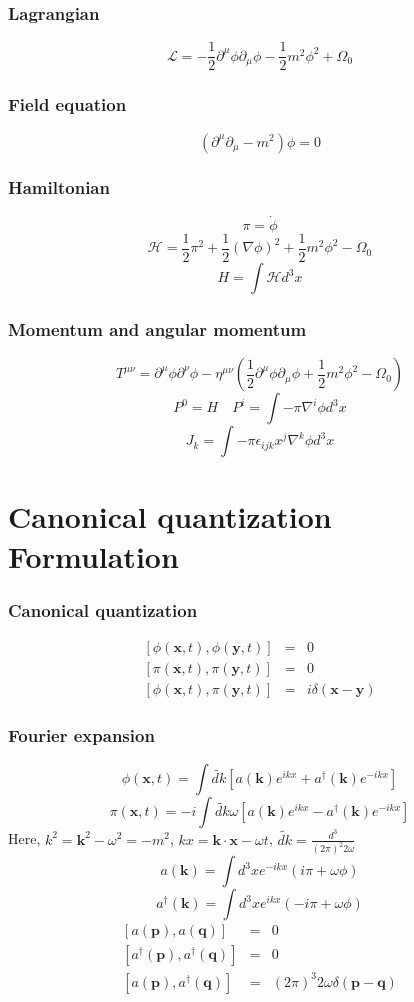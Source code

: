 \subsubsection{Lagrangian}
\[\mathcal{L} = -\frac{1}{2} \partial^{\mu} \phi \partial_{\mu} \phi -\frac{1}{2}m^2 \phi^2 + \Omega_0\]
\subsubsection{Field equation}
\[(\partial^{\mu} \partial_{\mu} - m^2) \phi = 0\]
\subsubsection{Hamiltonian}
\[\pi = \dot{\phi}\]
\[\mathcal{H} = \frac{1}{2} \pi^2 + \frac{1}{2} (\nabla \phi)^2 + \frac{1}{2} m^2 \phi^2-\Omega_0\]
\[H = \int \mathcal{H} d^3 x\]
\subsubsection{Momentum and angular momentum}
\[T^{\mu \nu} = \partial^{\mu} \phi \partial^{\nu} \phi - \eta^{\mu \nu}(\frac{1}{2}\partial^{\mu}\phi \partial_{\mu} \phi + \frac{1}{2}m^2 \phi^2 -\Omega_0)\]
\[P^0 = H \quad P^i = \int -\pi \nabla^i \phi d^3 x\]
\[J_k = \int - \pi \epsilon_{ijk} x^{j} \nabla^{k} \phi d^3 x\]

\section{Canonical quantization Formulation}
\subsubsection{Canonical quantization}
\begin{eqnarray}
\left[\phi(\bm{x},t),\phi(\bm{y},t)\right] &=& 0 \nonumber \\
\left[\pi(\bm{x},t),\pi(\bm{y},t)\right] &=& 0 \nonumber \\
\left[\phi(\bm{x},t),\pi(\bm{y},t)\right] &=& i \delta(\bm{x}-\bm{y}) \nonumber
\end{eqnarray}
\subsubsection{Fourier expansion}
\[\phi(\bm{x},t) = \int \widetilde{dk} \left[ a(\bm{k})e^{ikx} + a^{\dagger}(\bm{k})e^{-ikx} \right]\]
\[\pi(\bm{x},t) = -i \int  \widetilde{dk} \omega \left[ a(\bm{k})e^{ikx} - a^{\dagger}(\bm{k})e^{-ikx} \right]\]
Here, $k^2 = \bm{k}^2 - \omega^2 = -m^2$, $kx = \bm{k}\cdot \bm{x} - \omega t$, $\widetilde{dk} = \frac{d^3}{(2\pi)^2 2\omega}$
\[a(\bm{k}) = \int d^3 x e^{-ikx}(i\pi+\omega \phi)\]
\[a^{\dagger}(\bm{k}) = \int d^3 x e^{ikx}(-i\pi+\omega \phi)\]
\begin{eqnarray}
\left[a(\bm{p}),a(\bm{q})\right] &=& 0 \nonumber \\
\left[a^{\dagger}(\bm{p}),a^{\dagger}(\bm{q})\right] &=& 0 \nonumber \\
\left[a(\bm{p}),a^{\dagger}(\bm{q})\right] &=& (2\pi)^3 2\omega \delta(\bm{p}-\bm{q}) \nonumber
\end{eqnarray}
